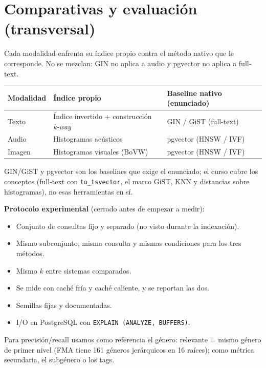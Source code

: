 \documentclass[11pt]{article}
\begin{document}
\section{Comparativas y evaluación (transversal)}

Cada modalidad enfrenta su índice propio contra el método nativo que le corresponde. No se mezclan: GIN no aplica a audio y pgvector no aplica a full-text.

\begin{center}
\begin{tabular}{@{}lll@{}}
\toprule
\textbf{Modalidad} & \textbf{Índice propio} & \textbf{Baseline nativo (enunciado)} \\
\midrule
Texto  & Índice invertido + construcción \emph{k-way} & GIN / GiST (full-text) \\
Audio  & Histogramas acústicos    & pgvector (HNSW / IVF) \\
Imagen & Histogramas visuales (BoVW) & pgvector (HNSW / IVF) \\
\bottomrule
\end{tabular}
\end{center}

GIN/GiST y pgvector son los baselines que exige el enunciado; el curso cubre los conceptos (full-text con \texttt{to\_tsvector}, el marco GiST, KNN y distancias sobre histogramas), no esas herramientas en sí.

\textbf{Protocolo experimental} (cerrado antes de empezar a medir):

\begin{itemize}[leftmargin=1.4em, itemsep=0.15em]
  \item Conjunto de consultas fijo y separado (no visto durante la indexación).
  \item Mismo subconjunto, misma consulta y mismas condiciones para los tres métodos.
  \item Mismo $k$ entre sistemas comparados.
  \item Se mide con caché fría y caché caliente, y se reportan las dos.
  \item Semillas fijas y documentadas.
  \item I/O en PostgreSQL con \texttt{EXPLAIN (ANALYZE, BUFFERS)}.
\end{itemize}

Para precisión/recall usamos como referencia el género: relevante = mismo género de primer nivel (FMA tiene 161 géneros jerárquicos en 16 raíces); como métrica secundaria, el subgénero o los tags.
\end{document}
